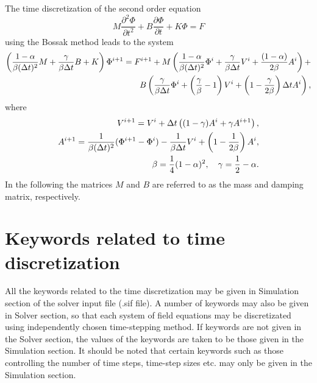 \begin{versiona}
The time discretization of the second order equation
\begin{equation}\label{EqToTimeDiscretizate2}
M\frac{\partial^2\Phi}{\partial t^2} + B\frac{\partial\Phi}{\partial t} + K\Phi = F
\end{equation}
using the Bossak method leads to the system
%
\begin{equation}
\begin{split}
\left (\frac{1-\alpha}{\beta(\Delta t)^2}M + 
\frac{\gamma}{\beta\Delta t} B + K\right )\Phi^{i+1} =
F^{i+1} + M\left ( \frac{1-\alpha}{\beta(\Delta t)^2} \Phi^{i} + 
\frac{\gamma}{\beta\Delta t}V^i + 
 \frac{(1-\alpha)}{2\beta}A^i\right ) + \cr
B\left (
\frac{\gamma}{\beta\Delta t}\Phi^i + 
\left(\frac{\gamma}{\beta}-1\right)V^i+
\left(1-\frac{\gamma}{2\beta}\right)\Delta tA^i\right), 
\end{split}
\end{equation}
%
where
\begin{equation}
\begin{split}
V^{i+1} = V^i + \Delta t\left ((1-\gamma)A^i+\gamma A^{i+1}\right ), \cr
A^{i+1} = \frac{1}{\beta(\Delta t)^2}(\Phi^{i+1}-\Phi^i)-\frac{1}{\beta\Delta t}V^i+
\left( 1-\frac{1}{2\beta}\right )A^i,  \cr
\beta = \frac{1}{4}(1-\alpha)^2, \quad \gamma = \frac{1}{2} - \alpha.
\end{split}
\end{equation}
In the following the matrices $M$ and $B$ are referred to as the mass and damping
matrix, respectively.


\section{Keywords related to time discretization}

\end{versiona}

All the keywords related to the time discretization may be given in Simulation section of 
the solver input file (.sif file). A number of keywords may also be given in Solver section,
so that each system of field equations may be discretizated using independently chosen 
time-stepping method.
If keywords are not given in the Solver
section, the values of the keywords are taken to be those given in the Simulation section.
It should be noted that certain keywords such as those controlling the number of time steps, 
time-step sizes etc. may only be given in the Simulation section.

